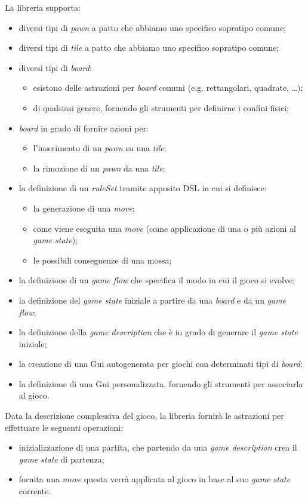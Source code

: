 La libreria supporta:
%
\begin{itemize}
    \item diversi tipi di \textit{pawn} a patto che abbiamo uno specifico sopratipo comune;
    \item diversi tipi di \textit{tile} a patto che abbiamo uno specifico sopratipo comune;
    \item diversi tipi di \textit{board}:
          \begin{itemize}
              \item esistono delle astrazioni per \textit{board} comuni (e.g. rettangolari, quadrate, \dots);
              \item di qualsiasi genere, fornendo gli strumenti per definirne i confini fisici;
          \end{itemize}
    \item \textit{board} in grado di fornire azioni per:
          \begin{itemize}
              \item l'inserimento di un \textit{pawn} su una \textit{tile};
              \item la rimozione di un \textit{pawn} da una \textit{tile};
          \end{itemize}
    \item la definizione di un \textit{ruleSet} tramite apposito DSL in cui si definisce:
          \begin{itemize}
              \item la generazione di una \textit{move};
              \item come viene eseguita una \textit{move} (come applicazione di una o più azioni al \textit{game state});
              \item le possibili conseguenze di una mossa;
          \end{itemize}
    \item la definizione di un \textit{game flow} che specifica il modo in cui il gioco si evolve;
    \item la definizione del \textit{game state} iniziale a partire da una \textit{board} e da un \textit{game flow};
    \item la definizione della \textit{game description} che è in grado di generare il \textit{game state} iniziale;
    \item la creazione di una Gui autogenerata per giochi con determinati tipi di \textit{board};
    \item la definizione di una Gui personalizzata, fornendo gli strumenti per associarla al gioco.
\end{itemize}
%
Data la descrizione complessiva del gioco, la libreria fornirà le astrazioni per effettuare le seguenti operazioni:
%
\begin{itemize}
    \item inizializzazione di una partita, che partendo da una \textit{game description} crea il \textit{game state} di partenza;
    \item fornita una \textit{move} questa verrà applicata al gioco in base al suo \textit{game state} corrente.
\end{itemize}

